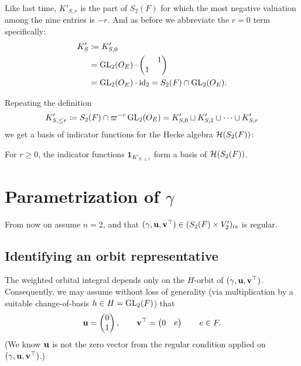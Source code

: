Like last time, $K'_{S,r}$ is the part of $S_2(F)$
for which the most negative valuation among the nine entries is $-r$.
And as before we abbreviate the $r = 0$ term specifically:
\begin{align*}
  K'_S
  &\coloneqq K'_{S,0} \\
  &= \operatorname{GL}_2(O_E) \cdot \begin{pmatrix} & 1 \\ 1 \end{pmatrix} \\
  &= \operatorname{GL}_2(O_E) \cdot \operatorname{id}_2 = S_2(F) \cap \operatorname{GL}_2(O_E).
\end{align*}

Repeating the definition
\[ K'_{S, \le r} \coloneqq S_2(F) \cap \varpi^{-r} \operatorname{GL}_2(O_E)
  = K'_{S,0} \sqcup K'_{S,1} \sqcup \dots \sqcup K'_{S,r} \]
we get a basis of indicator functions for the Hecke algebra $\mathcal H(S_2(F))$:
\begin{corollary}
  For $r \ge 0$, the indicator functions $\mathbf{1}_{K'_{S, \le r}}$
  form a basis of $\mathcal H(S_2(F))$.
\end{corollary}

\section{Parametrization of $\gamma$}
From now on assume $n = 2$,
and that $(\gamma, \mathbf u, \mathbf v^\top) \in (S_2(F) \times V'_2)_{\mathrm{rs}}$ is regular.

\subsection{Identifying an orbit representative}
The weighted orbital integral depends only on the $H$-orbit of $(\gamma, \mathbf u, \mathbf v^\top)$.
Consequently, we may assume without loss of generality
(via multiplication by a suitable change-of-basis $h \in H = \operatorname{GL}_2(F)$) that
\[ \mathbf u = \begin{pmatrix} 0 \\ 1 \end{pmatrix}, \qquad
  \mathbf v^\top = \begin{pmatrix} 0 & e \end{pmatrix} \qquad e \in F. \]
(We know $\mathbf u$ is not the zero vector from the regular condition
applied on $(\gamma, \mathbf u, \mathbf v^\top)$.)

